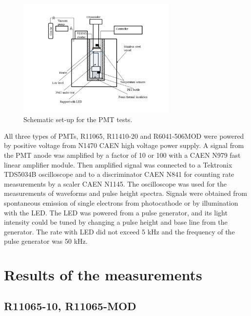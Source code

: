 \documentclass[a4paper,11pt]{article}
\begin{document}
\begin{figure}[htbp]
\centering
\includegraphics[width=0.7\textwidth,viewport=1 1 700 500,clip]{figures/set-up.png}
\caption{Schematic set-up for the PMT tests.}
\label{fig:set-up}
\end{figure}

All three types of PMTs,  R11065, R11410-20  and R6041-506MOD were powered by positive voltage from N1470 CAEN high voltage 
power supply. A signal from the PMT anode was amplified by a factor of 10 or 100 with a CAEN N979 fast linear amplifier module. 
Then amplified signal was connected to a Tektronix TDS5034B oscilloscope  and to a discriminator CAEN N841 for counting rate 
measurements by a scaler CAEN N1145. The oscilloscope was used for the measurements of waveforms and pulse height spectra. 
Signals were obtained from spontaneous emission of single electrons from photocathode or by illumination with the LED. 
The LED was powered from a pulse generator, and its light intensity could be tuned by changing a pulse height and base line 
from the generator. The rate with LED did not exceed 5 kHz and the frequency of the pulse generator was 50 kHz.

\section{Results of the measurements}
\subsection{R11065-10, R11065-MOD}
\end{document}
